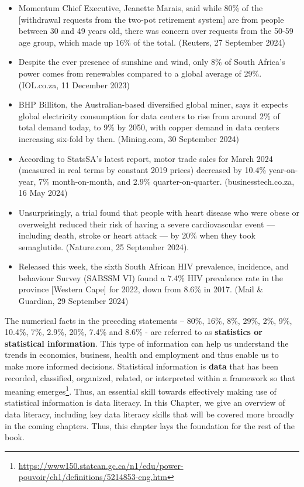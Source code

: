 \documentclass[
]{book}
\begin{document}
\begin{itemize}
\item
  Momentum Chief Executive, Jeanette Marais, said while 80\% of the {[}withdrawal requests from the two-pot retirement system{]} are from people between 30 and 49 years old, there was concern over requests from the 50-59 age group, which made up 16\% of the total. (Reuters, 27 September 2024)
\item
  Despite the ever presence of sunshine and wind, only 8\% of South Africa's power comes from renewables compared to a global average of 29\%. (IOL.co.za, 11 December 2023)
\item
  BHP Billiton, the Australian-based diversified global miner, says it expects global electricity consumption for data centers to rise from around 2\% of total demand today, to 9\% by 2050, with copper demand in data centers increasing six-fold by then. (Mining.com, 30 September 2024)
\item
  According to StatsSA's latest report, motor trade sales for March 2024 (measured in real terms by constant 2019 prices) decreased by 10.4\% year-on-year, 7\% month-on-month, and 2.9\% quarter-on-quarter. (businesstech.co.za, 16 May 2024)
\item
  Unsurprisingly, a trial found that people with heart disease who were obese or overweight reduced their risk of having a severe cardiovascular event --- including death, stroke or heart attack --- by 20\% when they took semaglutide. (Nature.com, 25 September 2024).
\item
  Released this week, the sixth South African HIV prevalence, incidence, and behaviour Survey (SABSSM VI) found a 7.4\% HIV prevalence rate in the province {[}Western Cape{]} for 2022, down from 8.6\% in 2017. (Mail \& Guardian, 29 September 2024)
\end{itemize}

The numerical facts in the preceding statements -- 80\%, 16\%, 8\%, 29\%, 2\%, 9\%, 10.4\%, 7\%, 2.9\%, 20\%, 7.4\% and 8.6\% - are referred to as \textbf{statistics or statistical information}. This type of information can help us understand the trends in economics, business, health and employment and thus enable us to make more informed decisions. Statistical information is \textbf{data} that has been recorded, classified, organized, related, or interpreted within a framework so that meaning emerges\footnote{\url{https://www150.statcan.gc.ca/n1/edu/power-pouvoir/ch1/definitions/5214853-eng.htm}\href{https://www.media.mit.edu/publications/designing-tools-and-activities-for-data-literacy-learners/}{}}. Thus, an essential skill towards effectively making use of statistical information is data literacy. In this Chapter, we give an overview of data literacy, including key data literacy skills that will be covered more broadly in the coming chapters. Thus, this chapter lays the foundation for the rest of the book.
\end{document}
